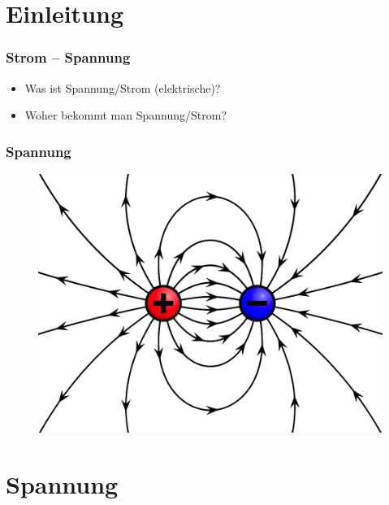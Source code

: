 

\subtitle{Technik 02: \\
          Spannung und Strom, Wechselspannung \\[2em]}
\date{Stand 10.10.2016}


\section*{Einleitung}

\begin{frame}
  \frametitle{Strom -- Spannung}
  \begin{itemize}
    \item Was ist Spannung/Strom (elektrische)?
    \item Woher bekommt man Spannung/Strom?
  \end{itemize}
\end{frame}

\begin{frame}
  \frametitle{Spannung}
  \begin{center}
    \begin{figure}
      \includegraphics[width=.6\textwidth,height=.75\textheight,keepaspectratio]{e02/ladung.png}
    \end{figure}
  \end{center}
\end{frame}


\section*{Spannung}

